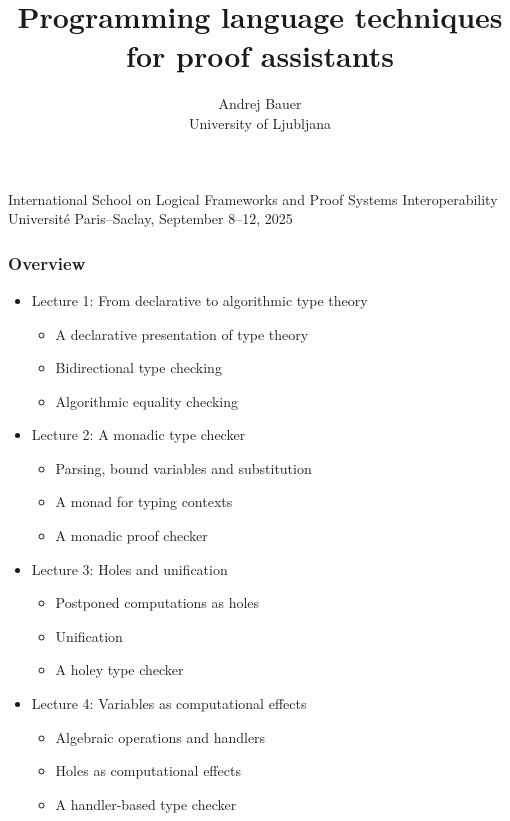 \documentclass[10pt]{beamer}
\title{Programming language techniques\\ for proof assistants}
\author{Andrej Bauer\\University of Ljubljana}
\date{}
\begin{document}
\begin{frame}
\hbox{}\vfil

\titlepage

\vfil

\begin{center}
\footnotesize
International School on Logical Frameworks and Proof Systems Interoperability \\
Université Paris--Saclay, September 8--12, 2025
\end{center}

\end{frame}


\begin{frame}
  \frametitle{Overview}

  \begin{itemize}
  \item Lecture 1: From declarative to algorithmic type theory
    \begin{itemize}\footnotesize
    \item A declarative presentation of type theory
    \item Bidirectional type checking
    \item Algorithmic equality checking
    \end{itemize}
  \item \pause
    Lecture 2: A monadic type checker
    \begin{itemize}\footnotesize
    \item Parsing, bound variables and substitution
    \item A monad for typing contexts
    \item A monadic proof checker
    \end{itemize}
  \item \pause
    Lecture 3: Holes and unification
    \begin{itemize}\footnotesize
    \item Postponed computations as holes
    \item Unification
    \item A holey type checker
    \end{itemize}
  \item \pause
    Lecture 4: Variables as computational effects
    \begin{itemize}\footnotesize
    \item Algebraic operations and handlers
    \item Holes as computational effects
    \item A handler-based type checker
    \end{itemize}
  \end{itemize}
\end{frame}
\end{document}
